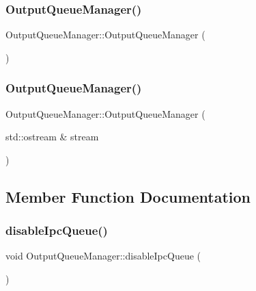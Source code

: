 \subsubsection{\texorpdfstring{OutputQueueManager()}{OutputQueueManager()}\hspace{0.1cm}{\footnotesize\ttfamily [1/2]}}
{\footnotesize\ttfamily Output\+Queue\+Manager\+::\+Output\+Queue\+Manager (\begin{DoxyParamCaption}{ }\end{DoxyParamCaption})\hspace{0.3cm}{\ttfamily [explicit]}}

\mbox{\label{class_output_queue_manager_a2a4013a7feaab6dae760946b383ff3da}} 
\subsubsection{\texorpdfstring{OutputQueueManager()}{OutputQueueManager()}\hspace{0.1cm}{\footnotesize\ttfamily [2/2]}}
{\footnotesize\ttfamily Output\+Queue\+Manager\+::\+Output\+Queue\+Manager (\begin{DoxyParamCaption}\item[{std\+::ostream \&}]{stream }\end{DoxyParamCaption})\hspace{0.3cm}{\ttfamily [explicit]}}



\subsection{Member Function Documentation}
\mbox{\label{class_output_queue_manager_a245cad36d3ca48fa0eb94bed6825e1ed}} 
\subsubsection{\texorpdfstring{disableIpcQueue()}{disableIpcQueue()}}
{\footnotesize\ttfamily void Output\+Queue\+Manager\+::disable\+Ipc\+Queue (\begin{DoxyParamCaption}{ }\end{DoxyParamCaption})}

